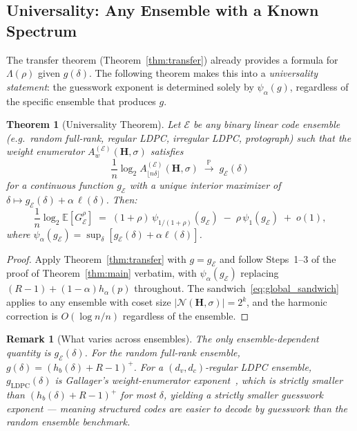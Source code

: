 \documentclass[journal,10pt,onecolumn]{IEEEtran}
\newtheorem{theorem}{Theorem}
\newtheorem{remark}{Remark}
\newcommand{\Eb}{\mathbb{E}}
\newcommand{\Pb}{\mathbb{P}}
\newcommand{\Hb}{h_b}
\newcommand{\Hm}{\mathbf{H}}
\begin{document}
\subsection{Universality: Any Ensemble with a Known Spectrum}

The transfer theorem (Theorem~\ref{thm:transfer}) already provides a
formula for $\Lambda(\rho)$ given $g(\delta)$.  The following theorem
makes this into a \emph{universality statement}: the guesswork
exponent is determined solely by $\psi_\alpha(g)$, regardless of the
specific ensemble that produces $g$.

\begin{theorem}[Universality Theorem]
\label{thm:universality}
Let $\mathcal{E}$ be any binary linear code ensemble (e.g.\
random full-rank, regular LDPC, irregular LDPC, protograph) such
that the weight enumerator $A_w^{(\mathcal{E})}(\Hm,\sigma)$
satisfies
\begin{equation}
    \frac{1}{n}\log_2 A_{\lfloor n\delta\rfloor}^{(\mathcal{E})}(\Hm,\sigma)
    \;\xrightarrow{\;\Pb\;}\;
    g_{\mathcal{E}}(\delta)
    \label{eq:ensemble_spectrum}
\end{equation}
for a continuous function $g_{\mathcal{E}}$ with a unique interior
maximizer of $\delta\mapsto g_{\mathcal{E}}(\delta)+\alpha\,\ell(\delta)$.
Then:
\begin{equation}
    \frac{1}{n}\log_2\Eb\!\left[G_{\mathcal{E}}^{\rho}\right]
    \;=\;
    (1+\rho)\,\psi_{1/(1+\rho)}(g_{\mathcal{E}})
    \;-\;\rho\,\psi_1(g_{\mathcal{E}})
    \;+\;o(1),
    \label{eq:universality}
\end{equation}
where $\psi_\alpha(g_{\mathcal{E}})=\sup_{\delta}[g_{\mathcal{E}}(\delta)+\alpha\ell(\delta)]$.
\end{theorem}

\begin{proof}
Apply Theorem~\ref{thm:transfer} with $g=g_{\mathcal{E}}$
and follow Steps~1--3 of the proof of Theorem~\ref{thm:main}
verbatim, with $\psi_\alpha(g_{\mathcal{E}})$ replacing
$(R-1)+(1-\alpha)h_\alpha(p)$ throughout.
The sandwich~\eqref{eq:global_sandwich} applies to any ensemble
with coset size $|\mathcal{N}(\Hm,\sigma)|=2^k$, and the
harmonic correction is $O(\log n/n)$ regardless of the ensemble.
\end{proof}

\begin{remark}[What varies across ensembles]
The only ensemble-dependent quantity is $g_{\mathcal{E}}(\delta)$.
For the random full-rank ensemble, $g(\delta)=(\Hb(\delta)+R-1)^+$.
For a $(d_v,d_c)$-regular LDPC ensemble, $g_{\mathrm{LDPC}}(\delta)$
is Gallager's weight-enumerator exponent~\cite{gallager1963low},
which is strictly smaller than $(\Hb(\delta)+R-1)^+$ for most
$\delta$, yielding a strictly smaller guesswork exponent ---
meaning structured codes are easier to decode by guesswork than
the random ensemble benchmark.
\end{remark}
\end{document}
